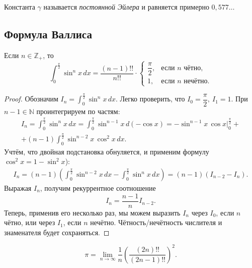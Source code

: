 \begin{remark}
	Константа \(\gamma\) называется \textit{постоянной Эйлера} и равняется примерно \(0,577\ldots\)
\end{remark}

\subsection{Формула Валлиса}

\hypertarget{vallem}{}
\begin{lemma}
	Если \(n \in \mathbb{Z}_+\), то \[
	\int_0^{\frac{\pi}{2}} \sin^n x \, dx = \frac{(n - 1)!!}{n!!} \cdot
	\begin{cases}
		\dfrac{\pi}{2}, &\text{если \(n\) чётно}, \\
		1, 				&\text{если \(n\) нечётно}.
	\end{cases}
	\]
\end{lemma}

\begin{proof}
	Обозначим \(I_n = \displaystyle\int_0^{\frac{\pi}{2}} \sin^n x \, dx\). Легко проверить, что \(I_0 = \dfrac{\pi}{2}, \ I_1 = 1\). При \(n - 1 \in \mathbb{N}\) проинтегрируем по частям:
	\begin{multline*}
		I_n = \int_0^{\frac{\pi}{2}} \sin^n x \, dx = \int_0^{\frac{\pi}{2}} \sin^{n - 1} x \, d(-\cos x) = -\sin^{n - 1} x \, \cos x \bigg|_0^{\frac{\pi}{2}} + \\ 
		+ (n - 1) \int_0^\frac{\pi}{2} \sin^{n - 2} x \, \cos^2 x \, dx.
	\end{multline*}
	Учтём, что двойная подстановка обнуляется, и применим формулу \(\cos^2 x = 1 - \sin^2 x\)):
	\begin{multline*}
		I_n = (n - 1) \left(\int_0^\frac{\pi}{2} \sin^{n - 2} x \, dx - \int_0^\frac{\pi}{2} \sin^n x \, dx \right) = (n - 1) (I_{n - 2} - I_n).
	\end{multline*}
	Выражая \(I_n\), получим рекуррентное соотношение \[
	I_n = \frac{n - 1}{n} I_{n - 2}.
	\]
	Теперь, применив его несколько раз, мы можем выразить \(I_n\) через \(I_0\), если \(n\) чётно, или через \(I_1\), если \(n\) нечётно. Чётность/нечётность числителя и знаменателя будет сохраняться.
\end{proof}

\hypertarget{wall}{}
\begin{theorem}
	\[
	\pi = \lim_{n \to \infty} \frac{1}{n} \left(\frac{(2n)!!}{(2n - 1)!!} \right)^2.
	\]
\end{theorem}

